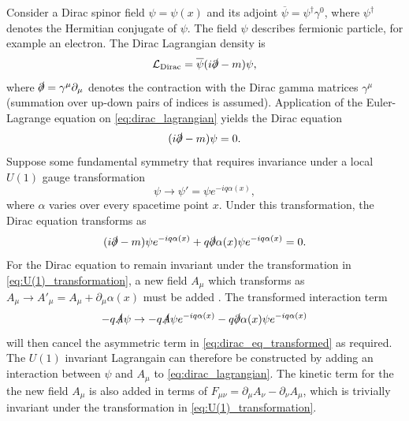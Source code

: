 Consider a Dirac spinor field $\psi = \psi(x)$ and its adjoint $\overline{\psi} = \psi^\dagger \gamma^0$, where $\psi^\dagger$ denotes the Hermitian conjugate of $\psi$.
The field $\psi$ describes fermionic \spinhalf particle, for example an electron.
The Dirac Lagrangian density is
%
\begin{equation}\label{eq:dirac_lagrangian}
  \mathcal{L}_{\textnormal{Dirac}} = \overline{\psi} (i \slashed{\partial}  - m )\psi,
\end{equation}
%
where $\slashed{\partial} = \gamma^\mu \partial_\mu$ denotes the contraction with the Dirac gamma matrices $\gamma^\mu$ (summation over up-down pairs of indices is assumed).
Application of the Euler-Lagrange equation on \cref{eq:dirac_lagrangian} yields the Dirac equation
%
\begin{equation}\label{eq:dirac_eq}
  (i \slashed{\partial}  - m )\psi = 0 .
\end{equation}
%
Suppose some fundamental symmetry that requires invariance under a local $U(1)$ gauge transformation
%
\begin{equation}\label{eq:U(1)_transformation}
  \psi \rightarrow \psi' = \psi e^{- i q \alpha(x)} ,
\end{equation}
%
where $\alpha$ varies over every spacetime point $x$.
Under this transformation, the Dirac equation transforms as 
%
\begin{equation}\label{eq:dirac_eq_transformed}
  (i \slashed{\partial} - m ) \psi e^{- i q \alpha(x)} + q \slashed{\partial}\alpha(x) \psi e^{- i q \alpha(x)} = 0.
\end{equation}
%
For the Dirac equation to remain invariant under the transformation in \cref{eq:U(1)_transformation}, a new field $A_\mu$ which transforms as $A_\mu \rightarrow A'_\mu = A_\mu + \partial_\mu \alpha(x)$ must be added .
The transformed interaction term
%
\begin{equation}
  - q \slashed{A} \psi \rightarrow - q \slashed{A} \psi e^{- i q \alpha(x)} - q \slashed{\partial} \alpha(x) \psi e^{- i q \alpha(x)}
\end{equation}
%
will then cancel the asymmetric term in \cref{eq:dirac_eq_transformed} as required.
The $U(1)$ invariant Lagrangain can therefore be constructed by adding an interaction between $\psi$ and $A_\mu$ to \cref{eq:dirac_lagrangian}. The kinetic term for the the new field $A_\mu$ is also added in terms of $F_{\mu\nu} = \partial_\mu A_\nu - \partial_\nu A_\mu$, which is trivially invariant under the transformation in \cref{eq:U(1)_transformation}.
